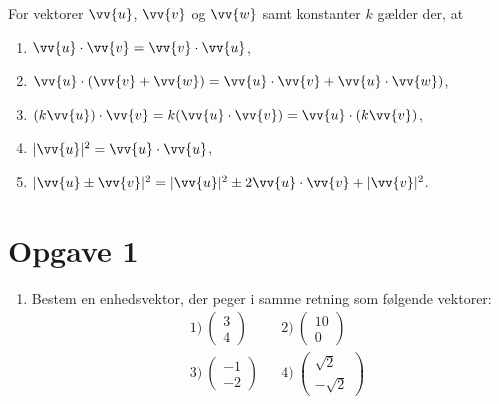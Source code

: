 \begin{setn}
For vektorer $\vv{u}$, $\vv{v}$ og $\vv{w}$ samt konstanter $k$ gælder der, at 
\begin{enumerate}[label=\roman*)]
\item $\vv{u}\cdot \vv{v} = \vv{v}\cdot \vv{u}$,
\item $\vv{u} \cdot (\vv{v}+\vv{w}) = \vv{u} \cdot \vv{v}+ \vv{u}\cdot \vv{w})$,
\item $(k\vv{u})\cdot \vv{v} = k(\vv{u}\cdot \vv{v}) = \vv{u}\cdot (k\vv{v})$,
\item $|\vv{u}|^2 = \vv{u}\cdot \vv{u}$,
\item $|\vv{u}\pm \vv{v}|^2 = |\vv{u}|^2 \pm 2\vv{u}\cdot\vv{v} + |\vv{v}|^2 $.
\end{enumerate}
\end{setn}
\section{Opgave 1}
\begin{enumerate}[label=\roman*)]
\item Bestem en enhedsvektor, der peger i samme retning som følgende vektorer:
\begin{align*}
&1)  \ \begin{pmatrix}3\\ 4 \end{pmatrix}   &&2) \ \begin{pmatrix}10\\ 0 \end{pmatrix}     \\
&3)  \  \begin{pmatrix}-1\\ -2 \end{pmatrix}   &&4) \  \begin{pmatrix}\sqrt{2}\\ -\sqrt{2} \end{pmatrix}    \\
\end{align*}
\end{enumerate}
